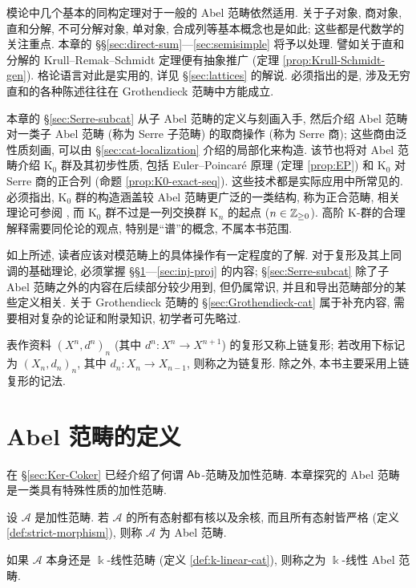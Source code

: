 模论中几个基本的同构定理对于一般的 Abel 范畴依然适用. 关于子对象, 商对象, 直和分解, 不可分解对象, 单对象, 合成列等基本概念也是如此; 这些都是代数学的关注重点. 本章的 \S\S\ref{sec:direct-sum}---\ref{sec:semisimple} 将予以处理. 譬如关于直和分解的 Krull--Remak--Schmidt 定理便有抽象推广 (定理 \ref{prop:Krull-Schmidt-gen}). 格论语言对此是实用的, 详见 \S\ref{sec:lattices} 的解说. 必须指出的是, 涉及无穷直和的各种陈述往往在 Grothendieck 范畴中方能成立.

本章的 \S\ref{sec:Serre-subcat} 从子 Abel 范畴的定义与刻画入手, 然后介绍 Abel 范畴对一类子 Abel 范畴 (称为 Serre 子范畴) 的取商操作 (称为 Serre 商); 这些商由泛性质刻画, 可以由 \S\ref{sec:cat-localization} 介绍的局部化来构造. 该节也将对 Abel 范畴介绍 $\mathrm{K}_0$ 群及其初步性质, 包括 Euler--Poincaré 原理 (定理 \ref{prop:EP}) 和 $\mathrm{K}_0$ 对 Serre 商的正合列 (命题 \ref{prop:K0-exact-seq}). 这些技术都是实际应用中所常见的. 必须指出, $\mathrm{K}_0$ 群的构造涵盖较 Abel 范畴更广泛的一类结构, 称为正合范畴, 相关理论可参阅 \cite{Bu10}, 而 $\mathrm{K}_0$ 群不过是一列交换群 $\mathrm{K}_n$ 的起点 ($n \in \mathbb{Z}_{\geq 0}$). 高阶 K-群的合理解释需要同伦论的观点, 特别是``谱''的概念, 不属本书范围.

\begin{wenxintishi}
	如上所述, 读者应该对模范畴上的具体操作有一定程度的了解. 对于复形及其上同调的基础理论, 必须掌握 \S\S\ref{sec:Abel-cat-def}---\ref{sec:inj-proj} 的内容; \S\ref{sec:Serre-subcat} 除了子 Abel 范畴之外的内容在后续部分较少用到, 但仍属常识, 并且和导出范畴部分的某些定义相关. 关于 Grothendieck 范畴的 \S\ref{sec:Grothendieck-cat} 属于补充内容, 需要相对复杂的论证和附录知识, 初学者可先略过.
	
	表作资料 $(X^n, d^n)_n$ (其中 $d^n: X^n \to X^{n+1}$) 的复形又称上链复形; 若改用下标记为 $(X_n, d_n)_n$, 其中 $d_n: X_n \to X_{n-1}$, 则称之为链复形. 除之外, 本书主要采用上链复形的记法.
\end{wenxintishi}


\section{Abel 范畴的定义}\label{sec:Abel-cat-def}
在 \S\ref{sec:Ker-Coker} 已经介绍了何谓 $\mathsf{Ab}$-范畴及加性范畴. 本章探究的 Abel 范畴是一类具有特殊性质的加性范畴.

\begin{definition}[Abel 范畴]
	设 $\mathcal{A}$ 是加性范畴. 若 $\mathcal{A}$ 的所有态射都有核以及余核, 而且所有态射皆严格 (定义 \ref{def:strict-morphism}), 则称 $\mathcal{A}$ 为 Abel 范畴.

	如果 $\mathcal{A}$ 本身还是 $\Bbbk$-线性范畴 (定义 \ref{def:k-linear-cat}), 则称之为 $\Bbbk$-线性 Abel 范畴.
\end{definition}

